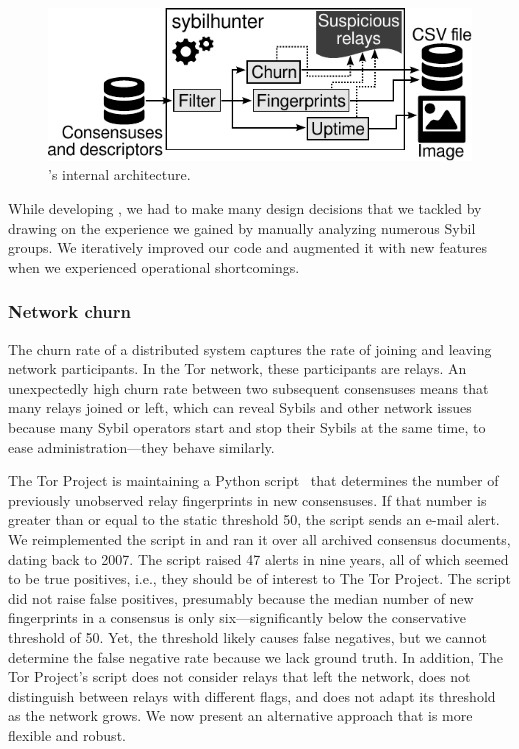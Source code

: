 \begin{figure}[t]
	\centering
	\includegraphics[width=0.9\linewidth]{diagrams/internal-architecture.pdf}
	\caption{\Sys's internal architecture.}
	\label{fig:shr-internal}
\end{figure}

While developing \sys, we had to make many design decisions that we
tackled by drawing on the experience we gained by manually analyzing numerous
Sybil groups.  We iteratively improved our code and augmented it with new
features when we experienced operational shortcomings.

\subsubsection{Network churn}
\label{sec:churn-time-series}
The churn rate of a distributed system captures the rate of joining and leaving
network participants.  In the Tor network, these participants are relays.  An
unexpectedly high churn rate between two subsequent consensuses means that many
relays joined or left, which can reveal Sybils and other network issues because
many Sybil operators start and stop their Sybils at the same time, to ease
administration---they behave similarly.

The Tor Project is maintaining a Python script~\cite{doctor} that determines the
number of previously unobserved relay fingerprints in new consensuses.  If that
number is greater than or equal to the static threshold 50, the script sends an
e-mail alert.  We reimplemented the script in \sys and ran it over all archived
consensus documents, dating back to 2007.  The script raised 47 alerts in nine
years, all of which seemed to be true positives, i.e., they should be of
interest to The Tor Project.  The script did not raise false positives,
presumably because the median number of new fingerprints in a consensus is only
six---significantly below the conservative threshold of 50.  Yet, the threshold
likely causes false negatives, but we cannot determine the false negative rate
because we lack ground truth.  In addition, The Tor Project's script does not
consider relays that left the network, does not distinguish between relays with
different flags, and does not adapt its threshold as the network grows.  We now
present an alternative approach that is more flexible and robust.

